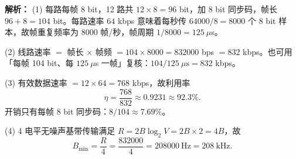 \begin{enumerate}
\ifshowsolutions\par\noindent\textbf{解析：}
(1) 每路每帧 8 bit，12 路共 $12\times8=96$ bit，加 8 bit 同步码，帧长 $96+8=104$ bit。每路速率 $64$ kbps 意味着每秒传 $64000/8=8000$ 个 8 bit 样本，故帧重复频率为 $8000$ 帧/秒，帧周期 $1/8000=125\ \mu$s。

(2) 线路速率 $=$ 帧长 $\times$ 帧频 $=104\times8000=832000$ bps $=832$ kbps。也可用「每帧 104 bit、每 $125\ \mu$s 一帧」复核：$104/125\ \mu\text{s}=832$ kbps。

(3) 有效数据速率 $=12\times64=768$ kbps，故利用率
\[
\eta=\frac{768}{832}\approx0.9231\approx92.3\%.
\]
开销只有每帧 8 bit 同步码：$8/104\approx7.69\%$。

(4) 4 电平无噪声基带传输满足 $R=2B\log_2 V=2B\times2=4B$，故
\[
B_{\min}=\frac{R}{4}=\frac{832000}{4}=208000\ \text{Hz}=208\ \text{kHz}.
\]

\else \answerarea[10] \fi

\end{enumerate}
